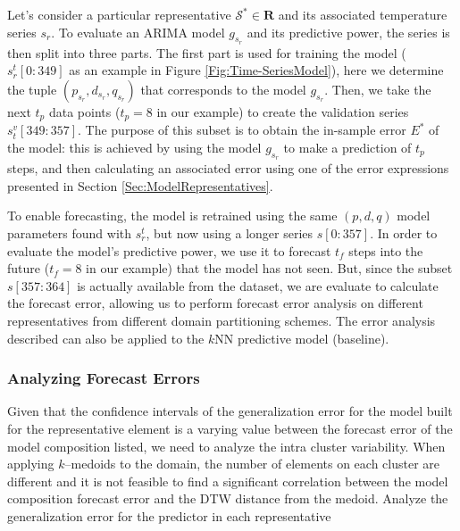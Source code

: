 Let's consider a particular representative $\mathcal{S}^{*} \in \mathbf{R}$ and its associated temperature series $s_r$. To evaluate an ARIMA model $g_{s_r}$ and its predictive power, the series is then split into three parts. The first part is used for training the model ($s^t_r[0:349]$ as an example in Figure \ref{Fig:Time-SeriesModel}), here we determine the tuple $(p_{s_r}, d_{s_r}, q_{s_r})$ that corresponds to the model $g_{s_r}$. Then, we take the next $t_p$ data points ($t_p = 8$ in our example) to create the validation series $s^v_t[349:357]$. The purpose of this subset is to obtain the in-sample error ${E^*}$ of the model: this is achieved by using the model $g_{s_r}$ to make a prediction of $t_p$ steps, and then calculating an associated error using one of the error expressions presented in Section \ref{Sec:ModelRepresentatives}.

To enable forecasting, the model is retrained using the same $(p, d, q)$ model parameters found with $s^t_r$, but now using a longer series $s[0:357]$. In order to evaluate the model's predictive power, we use it to forecast $t_f$ steps into the future ($t_f = 8$ in our example) that the model has not seen. But, since the subset $s[357:364]$ is actually available from the dataset, we are evaluate to calculate the forecast error, allowing us to perform forecast error analysis on different representatives from different domain partitioning schemes. The error analysis described can also be applied to the $k$NN predictive model (baseline).

\subsubsection{Analyzing Forecast Errors}
\label{Sec:AnalyzeForecastErrors}

Given that the confidence intervals of the generalization error for the model built for the representative element is a varying value between the forecast error of the model composition listed, we need to analyze the intra cluster variability. When applying $k$--medoids to the domain, the number of elements on each cluster are different and it is not feasible to find a significant correlation between the model composition forecast error and the DTW distance from the medoid.
Analyze the generalization error for the predictor in each representative 

